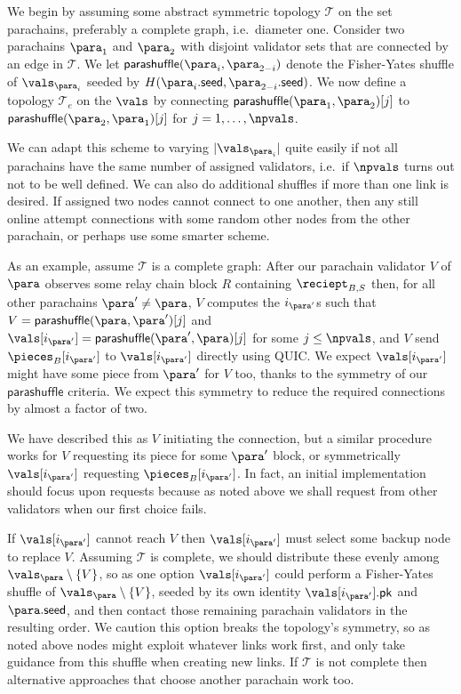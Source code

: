 We begin by assuming some abstract symmetric topology $\mathcal{T}$ on the set parachains, preferably a complete graph, i.e.\ diameter one.  Consider two parachains $\para_1$ and $\para_2$ with disjoint validator sets that are connected by an edge in $\mathcal{T}$.  We let $\mathsf{parashuffle}(\para_i,\para_{2-i})$ denote the Fisher-Yates shuffle of $\vals_{\para_i}$ seeded by $H( \para_i.\mathsf{seed}, \para_{2-i}.\mathsf{seed} )$.  We now define a topology $\mathcal{T}_e$ on the $\vals$ by connecting $\mathsf{parashuffle}(\para_1,\para_2)[j]$ to $\mathsf{parashuffle}(\para_2,\para_1)[j]$ for $j = 1,\ldots,\npvals$.

We can adapt this scheme to varying $|\vals_{\para_i}|$ quite easily if not all parachains have the same number of assigned validators, i.e.\ if $\npvals$ turns out not to be well defined.  We can also do additional shuffles if more than one link is desired.  
% 
If assigned two nodes cannot connect to one another, then any still online attempt connections with some random other nodes from the other parachain, or perhaps use some smarter scheme. 

As an example, assume $\mathcal{T}$ is a complete graph:  After our parachain validator $V$ of $\para$ observes some relay chain block $R$ containing $\reciept_{B,S}$ then, for all other parachains $\para' \ne \para$, $V$ computes the $i_{\para'}$s such that $V = \mathsf{parashuffle}(\para,\para')[j]$ and $\vals[i_{\para'}] = \mathsf{parashuffle}(\para',\para)[j]$ for some $j \leq \npvals$, and $V$ send $\pieces_B[i_{\para'}]$ to $\vals[i_{\para'}]$ directly using QUIC.  We expect $\vals[i_{\para'}]$ might have some piece from $\para'$ for $V$ too, thanks to the symmetry of our $\mathsf{parashuffle}$ criteria.  We expect this symmetry to reduce the required connections by almost a factor of two.

We have described this as $V$ initiating the connection, but a similar procedure works for $V$ requesting its piece for some $\para'$ block, or symmetrically $\vals[i_{\para'}]$ requesting $\pieces_B[i_{\para'}]$.  In fact, an initial implementation should focus upon requests because as noted above we shall request from other validators when our first choice fails. 

If $\vals[i_{\para'}]$ cannot reach $V$ then $\vals[i_{\para'}]$ must select some backup node to replace $V$.  Assuming $\mathcal{T}$ is complete, we should distribute these evenly among $\vals_\para \setminus \{V\}$, so as one option $\vals[i_{\para'}]$ could perform a Fisher-Yates shuffle of $\vals_\para \setminus \{V\}$, seeded by its own identity $\vals[i_{\para'}].\mathsf{pk}$ and $\para.\mathsf{seed}$, and then contact those remaining parachain validators in the resulting order.  We caution this option breaks the topology's symmetry, so as noted above nodes might exploit whatever links work first, and only take guidance from this shuffle when creating new links.  If $\mathcal{T}$ is not complete then alternative approaches that choose another parachain work too.  

